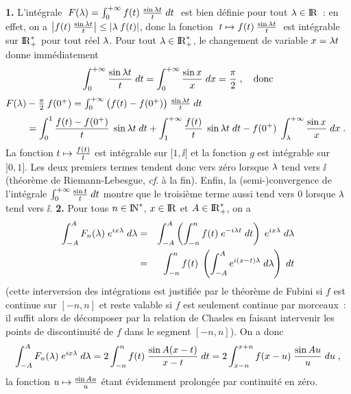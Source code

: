 \documentclass{article}
\begin{document}
{\bf 1.} L'int\'egrale $\;F(\lambda)=\int_0^{+\infty}f(t)\;{\sin\lambda t\over t}\;dt\;$ est bien
d\'efinie pour tout $\lambda\in{\rm I\kern-0.6mm R}$~: en effet, on a $\left|f(t)\>{\sin\lambda t\over t}\right|\leq|\lambda\>f(t)|$, donc la fonction $\;t\mapsto f(t)\>{\sin\lambda t\over t}\;$ est int\'egrable sur ${\rm I\kern-0.6mm R}_+^*$ pour tout r\'eel $\lambda$.
\msk\sect
Pour tout $\lambda\in{\rm I\kern-0.6mm R}_+^*$, le changement de variable $x=\lambda t$ donne
imm\'ediatement\vv
$$\int_0^{+\infty}{\sin\lambda t\over t}\;dt=\int_0^{+\infty}{\sin x\over x}\;dx={\pi\over2}\;,
  \quad\hbox{donc}$$\ssk\sect
$F(\lambda)-{\pi\over2}\>f(0^+)=\int_0^{+\infty}\big(f(t)-f(0^+)\big)\;
                                           {\sin\lambda t\over t}\;dt$
$$\qquad=\int_0^1{f(t)-f(0^+)\over t}\;\sin\lambda t
                                           \;dt+\int_1^{+\infty}{f(t)\over t}\;
                                           \sin\lambda t\;dt-f(0^+)\;\int_{\lambda}
                                           ^{+\infty}{\sin x\over x}\;dx\;.$$
La fonction $t\mapsto{f(t)\over t}$ est int\'egrable
sur $[1,\ii[$ et la fonction $g$ est int\'egrable sur $]0,1]$.
Les deux premiers
termes tendent donc vers z\'ero lorsque $\lambda$ tend vers $\ii$ (th\'eor\`eme de
Riemann-Lebesgue, {\it cf}. \`a la fin). Enfin, la (semi-)convergence de
l'int\'egrale $\int_0^{+\infty}{\sin t\over t}\;dt$ montre que le troisi\`eme terme
aussi tend vers 0 lorsque $\lambda$ tend vers $\ii$.
\eject
{\bf 2.} Pour tous $n\in{\rm I\kern-0.5mm N}^*$, $x\in{\rm I\kern-0.6mm R}$ et $A\in{\rm I\kern-0.6mm R}_+^*$, on a\vv
\begin{eqnarray*}
\int_{-A}^AF_n(\lambda)\;e^{ix\lambda}\;d\lambda
             & = & \int_{-A}^A\left(\int_{-n}^nf(t)\;
                    e^{-i\lambda t}\;dt\right)\;e^{ix\lambda}\;d\lambda\\
             & = & \int_{-n}^nf(t)\;\left(\int_{-A}^A
                    e^{i(x-t)\lambda}\;d\lambda\right)\;dt
\end{eqnarray*}
(cette interversion des int\'egrations est justifi\'ee par le th\'eor\`eme de
Fubini si $f$ est continue sur $[-n,n]$ et
reste valable si $f$ est
seulement continue par morceaux~: il suffit alors de d\'ecomposer
par la relation de Chasles en faisant intervenir les points de discontinuit\'e
de $f$ dans le segment $[-n,n]$). On a donc\vv
$$\int_{-A}^AF_n(\lambda)\;e^{ix\lambda}\;d\lambda
              = 2\int_{-n}^nf(t)\;{\sin A(x-t)\over x-t}\;dt
              = 2\int_{x-n}^{x+n}f(x-u)\;{\sin Au\over u}\;du\;,$$
la fonction $u\mapsto{\sin Au\over u}$ \'etant \'evidemment prolong\'ee par
continuit\'e en z\'ero.
\end{document}
